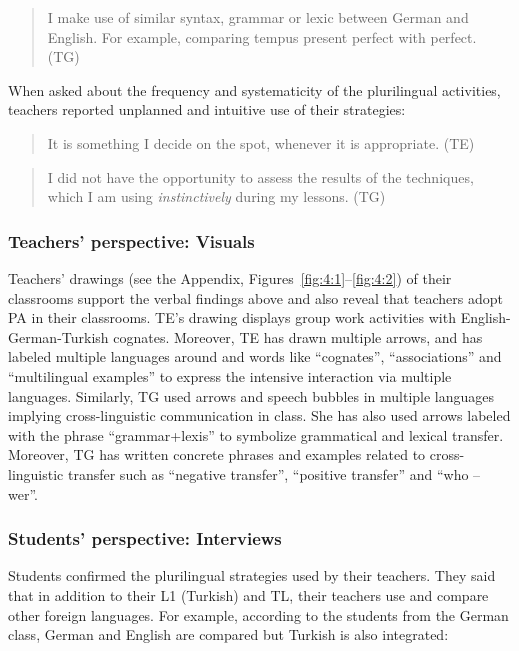 \documentclass[output=paper]{../langscibook}
\begin{document}
\begin{quote}
I make use of similar syntax, grammar or lexic between German and English. For example, comparing tempus present perfect with perfect. (TG) 
\end{quote}

\noindent When asked about the frequency and systematicity of the plurilingual activities, teachers reported unplanned and intuitive use of their strategies:

\begin{quote}
It is something I decide on the spot, whenever it is appropriate. (TE) 
\end{quote}

\begin{quote}
I did not have the opportunity to assess the results of the techniques, which I am using \emph{instinctively} during my lessons. (TG)
\end{quote}


\subsubsection{Teachers’ perspective: Visuals}


Teachers’ drawings (see the Appendix, Figures~\ref{fig:4:1}--\ref{fig:4:2}) of their classrooms support the verbal findings above and also reveal that teachers adopt PA in their classrooms. TE’s drawing displays group work activities with English-German-Turkish cognates. Moreover, TE has drawn multiple arrows, and has labeled multiple languages around and words like “cognates”, “associations” and “multilingual examples” to express the intensive interaction via multiple languages. Similarly, TG used arrows and speech bubbles in multiple languages implying cross-linguistic communication in class.  She has also used arrows labeled with the phrase “grammar+lexis” to symbolize grammatical and lexical transfer. Moreover, TG has written concrete phrases and examples related to cross-linguistic transfer such as “negative transfer”, “positive transfer” and “who – wer”.


\subsubsection{Students’ perspective: Interviews}


Students confirmed the plurilingual strategies used by their teachers. They said that in addition to their L1 (Turkish) and TL, their teachers use and compare other foreign languages. For example, according to the students from the German class, German and English are compared but Turkish is also integrated:
\end{document}
